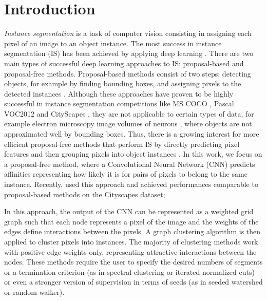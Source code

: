 
\section{Introduction}

\emph{Instance segmentation} is a task of computer vision consisting in assigning each pixel of an image to an object instance. %
The most success in instance segmentation (IS) has been achieved by applying deep learning \cite{he2017mask,romera2016recurrent,liu2018affinity}. There are two main types of successful deep learning approaches to IS: proposal-based and proposal-free methods. Proposal-based methods consist of two steps: detecting objects, for example by finding bounding boxes, and assigning pixels to the detected instances \cite{he2017mask,dai2016instance,li2017fully}. Although these approaches have proven to be highly successful in instance segmentation competitions like MS COCO \cite{lin2014microsoft}, Pascal VOC2012 \cite{everingham2010pascal} and CityScapes \cite{cordts2016cityscapes}, they are not applicable to certain types of data, for example electron microscopy image volumes of neurons \cite{arganda2015crowdsourcing}, where objects are not approximated well by bounding boxes. 
Thus, there is a growing interest for more efficient proposal-free methods that perform IS by directly predicting pixel features and then grouping pixels into object instances . In this work, we focus on a proposal-free method, where a Convolutional Neural Network (CNN) predicts affinities representing how likely it is for pairs of pixels to belong to the same instance. Recently, \cite{liu2018affinity} used this approach and achieved performances comparable to proposal-based methods on the Cityscapes dataset;  

In this approach, the output of the CNN can be represented as a weighted grid graph such that each node represents a pixel of the image and the weights of the edges define interactions between the pixels. A graph clustering algorithm is then applied to cluster pixels into instances. The majority of clustering methods work with positive edge weights only, representing attractive interactions between the nodes. These methods require the user to specify the desired numbers of segments or a termination criterion (as in spectral clustering or iterated normalized cuts) or even a stronger version of supervision in terms of seeds (as in seeded watershed or random walker).  

